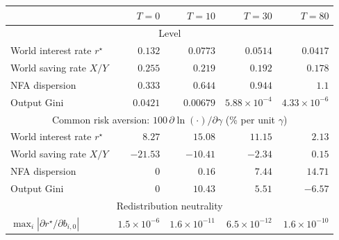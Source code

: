 \begin{tabular}{lrrrr}
\toprule
 & $T = 0$ & $T = 10$ & $T = 30$ & $T = 80$ \\
\midrule
\multicolumn{5}{c}{Level} \\
\midrule
World interest rate $r^{\star}$ & $0.132$ & $0.0773$ & $0.0514$ & $0.0417$ \\
World saving rate $X/Y$ & $0.255$ & $0.219$ & $0.192$ & $0.178$ \\
NFA dispersion & $0.333$ & $0.644$ & $0.944$ & $1.1$ \\
Output Gini & $0.0421$ & $0.00679$ & $5.88 \times 10^{-4}$ & $4.33 \times 10^{-6}$ \\
\midrule
\multicolumn{5}{c}{Common risk aversion: $100\,\partial \ln(\cdot)/\partial\gamma$ (\% per unit $\gamma$)} \\
\midrule
World interest rate $r^{\star}$ & $8.27$ & $15.08$ & $11.15$ & $2.13$ \\
World saving rate $X/Y$ & $-21.53$ & $-10.41$ & $-2.34$ & $0.15$ \\
NFA dispersion & $0$ & $0.16$ & $7.44$ & $14.71$ \\
Output Gini & $0$ & $10.43$ & $5.51$ & $-6.57$ \\
\midrule
\multicolumn{5}{c}{Redistribution neutrality} \\
\midrule
$\max_i |\partial r^{\star}/\partial b_{i,0}|$ & $1.5 \times 10^{-6}$ & $1.6 \times 10^{-11}$ & $6.5 \times 10^{-12}$ & $1.6 \times 10^{-10}$ \\
\bottomrule
\end{tabular}
